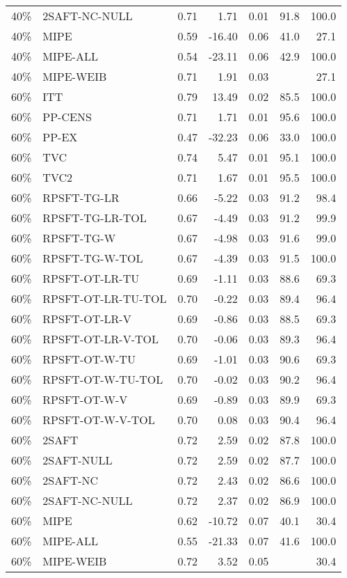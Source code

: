 \begin{table}[ht]
{\begin{tabular}{llrrrrr}
  40\% & 2SAFT-NC-NULL & 0.71 & 1.71 & 0.01 & 91.8 & 100.0 \\ 
  40\% & MIPE & 0.59 & -16.40 & 0.06 & 41.0 & 27.1 \\ 
  40\% & MIPE-ALL & 0.54 & -23.11 & 0.06 & 42.9 & 100.0 \\ 
  40\% & MIPE-WEIB & 0.71 & 1.91 & 0.03 &  & 27.1 \\ 
   \hline
60\% & ITT & 0.79 & 13.49 & 0.02 & 85.5 & 100.0 \\ 
  60\% & PP-CENS & 0.71 & 1.71 & 0.01 & 95.6 & 100.0 \\ 
  60\% & PP-EX & 0.47 & -32.23 & 0.06 & 33.0 & 100.0 \\ 
  60\% & TVC & 0.74 & 5.47 & 0.01 & 95.1 & 100.0 \\ 
  60\% & TVC2 & 0.71 & 1.67 & 0.01 & 95.5 & 100.0 \\ 
   \hline
60\% & RPSFT-TG-LR & 0.66 & -5.22 & 0.03 & 91.2 & 98.4 \\ 
  60\% & RPSFT-TG-LR-TOL & 0.67 & -4.49 & 0.03 & 91.2 & 99.9 \\ 
  60\% & RPSFT-TG-W & 0.67 & -4.98 & 0.03 & 91.6 & 99.0 \\ 
  60\% & RPSFT-TG-W-TOL & 0.67 & -4.39 & 0.03 & 91.5 & 100.0 \\ 
  60\% & RPSFT-OT-LR-TU & 0.69 & -1.11 & 0.03 & 88.6 & 69.3 \\ 
  60\% & RPSFT-OT-LR-TU-TOL & 0.70 & -0.22 & 0.03 & 89.4 & 96.4 \\ 
  60\% & RPSFT-OT-LR-V & 0.69 & -0.86 & 0.03 & 88.5 & 69.3 \\ 
  60\% & RPSFT-OT-LR-V-TOL & 0.70 & -0.06 & 0.03 & 89.3 & 96.4 \\ 
   \hline
60\% & RPSFT-OT-W-TU & 0.69 & -1.01 & 0.03 & 90.6 & 69.3 \\ 
  60\% & RPSFT-OT-W-TU-TOL & 0.70 & -0.02 & 0.03 & 90.2 & 96.4 \\ 
  60\% & RPSFT-OT-W-V & 0.69 & -0.89 & 0.03 & 89.9 & 69.3 \\ 
  60\% & RPSFT-OT-W-V-TOL & 0.70 & 0.08 & 0.03 & 90.4 & 96.4 \\ 
   \hline
60\% & 2SAFT & 0.72 & 2.59 & 0.02 & 87.8 & 100.0 \\ 
  60\% & 2SAFT-NULL & 0.72 & 2.59 & 0.02 & 87.7 & 100.0 \\ 
  60\% & 2SAFT-NC & 0.72 & 2.43 & 0.02 & 86.6 & 100.0 \\ 
  60\% & 2SAFT-NC-NULL & 0.72 & 2.37 & 0.02 & 86.9 & 100.0 \\ 
  60\% & MIPE & 0.62 & -10.72 & 0.07 & 40.1 & 30.4 \\ 
  60\% & MIPE-ALL & 0.55 & -21.33 & 0.07 & 41.6 & 100.0 \\ 
  60\% & MIPE-WEIB & 0.72 & 3.52 & 0.05 &  & 30.4 \\ 
   \hline
\end{tabular}
}
\end{table}
